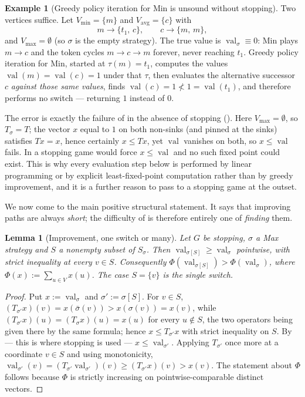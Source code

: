 \documentclass[11pt]{article}
\theoremstyle{plain}
\newtheorem{lemma}[theorem]{Lemma}
\theoremstyle{definition}
\newtheorem{example}[theorem]{Example}
\DeclareMathOperator{\val}{val}
\newcommand{\Vmax}{V_{\max}}
\newcommand{\Vmin}{V_{\min}}
\newcommand{\Vavg}{V_{\mathrm{avg}}}
\begin{document}
\begin{example}[Greedy policy iteration for Min is unsound without stopping]\label{ex:pi-fails}
Two vertices suffice. Let $\Vmin=\{m\}$ and $\Vavg=\{c\}$ with
\[
  m\to\{t_1,\,c\},\qquad c\to\{m,\,m\},
\]
and $\Vmax=\emptyset$ (so $\sigma$ is the empty strategy). The true value
is $\val_\sigma\equiv0$: Min plays $m\to c$ and the token cycles
$m\to c\to m$ forever, never reaching $t_1$. Greedy policy iteration for
Min, started at $\tau(m)=t_1$, computes the values $\val(m)=\val(c)=1$
under that $\tau$, then evaluates the alternative successor $c$
\emph{against those same values}, finds $\val(c)=1\not<1=\val(t_1)$, and
therefore performs no switch --- returning $1$ instead of $0$.

The error is exactly the failure of  in the absence
of stopping (). Here $\Vmax=\emptyset$, so
$T_\sigma=T$; the vector $x$ equal to $1$ on both non-sinks (and pinned
at the sinks) satisfies $Tx=x$, hence certainly $x\le Tx$, yet $\val$
vanishes on both, so $x\le\val$ fails. In a stopping game
 would force $x\le\val$ and no such fixed point
could exist. This is why every evaluation step below is performed by
linear programming or by explicit least-fixed-point computation rather
than by greedy improvement, and it is a further reason to pass to a
stopping game at the outset.
\end{example}

We now come to the main positive structural statement. It says that
improving paths are always \emph{short}; the difficulty of
 is therefore entirely one of \emph{finding} them.

\begin{lemma}[Improvement, one switch or many]\label{lem:switch}
Let $G$ be stopping, $\sigma$ a Max strategy and $S$ a nonempty subset of
$S_\sigma$. Then $\val_{\sigma[S]}\ge\val_\sigma$ pointwise, with strict
inequality at every $v\in S$. Consequently
$\Phi(\val_{\sigma[S]})>\Phi(\val_\sigma)$, where
$\Phi(x):=\sum_{u\in V}x(u)$. The case $S=\{v\}$ is the single switch.
\end{lemma}

\begin{proof}
Put $x:=\val_\sigma$ and $\sigma':=\sigma[S]$. For $v\in S$,
$(T_{\sigma'}x)(v)=x(\bar\sigma(v))>x(\sigma(v))=x(v)$, while
$(T_{\sigma'}x)(u)=(T_\sigma x)(u)=x(u)$ for every $u\notin S$, the two
operators being given there by the same formula; hence $x\le T_{\sigma'}x$
with strict inequality on $S$. By  --- this is where
stopping is used --- $x\le\val_{\sigma'}$. Applying $T_{\sigma'}$ once more
at a coordinate $v\in S$ and using monotonicity,
$\val_{\sigma'}(v)=(T_{\sigma'}\val_{\sigma'})(v)\ge(T_{\sigma'}x)(v)>x(v)$.
The statement about $\Phi$ follows because $\Phi$ is strictly increasing
on pointwise-comparable distinct vectors.
\end{proof}
\end{document}
